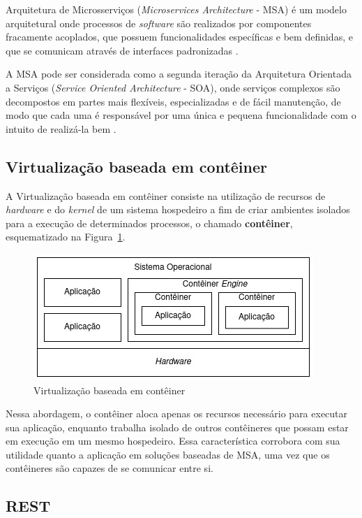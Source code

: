 \documentclass[12pt]{article}
\begin{document}
Arquitetura de Microsserviços (\textit{Microservices Architecture} - MSA) é um modelo arquitetural onde processos de \textit{software} são realizados por componentes fracamente acoplados, que possuem funcionalidades específicas e bem definidas, e que se comunicam através de interfaces padronizadas \cite{viggiato2018}.

A MSA pode ser considerada como a segunda iteração da Arquitetura Orientada a Serviços (\textit{Service Oriented Architecture} - SOA), onde serviços complexos são decompostos em partes mais flexíveis, especializadas e de fácil manutenção, de modo que cada uma é responsável por uma única e pequena funcionalidade com o intuito de realizá-la bem \cite{homay2019}. 

\subsection{Virtualização baseada em contêiner}

A Virtualização baseada em contêiner \cite{eder2016} consiste na utilização de recursos de \textit{hardware} e do \textit{kernel} de um sistema hospedeiro a fim de criar ambientes isolados para a execução de determinados processos, o chamado \textbf{contêiner}, esquematizado na Figura~\ref{fig:conteiner}.

\begin{figure}[ht]
	\centering
	\includegraphics[width=.8\textwidth]{conteiner.jpg}
	\caption{Virtualização baseada em contêiner}
	\label{fig:conteiner}
\end{figure} 

Nessa abordagem, o contêiner aloca apenas os recursos necessário para executar sua aplicação, enquanto trabalha isolado de outros contêineres que possam estar em execução em um mesmo hospedeiro. Essa característica corrobora com sua utilidade quanto a aplicação em soluções baseadas de MSA, uma vez que os contêineres são capazes de se comunicar entre si.

\subsection{REST}
\end{document}
